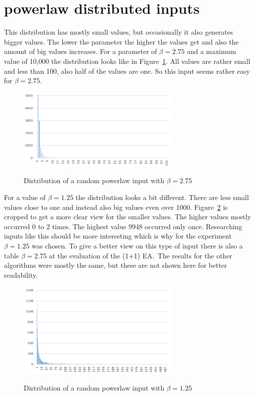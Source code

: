 \section{powerlaw distributed inputs}
This distribution has mostly small values, but occasionally it also generates bigger values.
The lower the parameter the higher the values get and also the amount of big values increases.
For a parameter of $\beta=2.75$ and a maximum value of 10,000 the distribution looks like in Figure~\ref{fig:powerDistExample1}.
All values are rather small and less than 100, also half of the values are one.
So this input seems rather easy for $\beta=2.75$.

\begin{figure}[h]
      \caption{Distribution of a random powerlaw input with $\beta=2.75$}
      \centering
      \includegraphics[width=0.7\textwidth]{figures/images/numberGenerator/powerlaw_-2_75.png}\label{fig:powerDistExample1}
\end{figure}

For a value of $\beta=1.25$ the distribution looks a bit different.
There are less small values close to one and instead also big values even over 1000.
Figure~\ref{fig:powerDistExample2} is cropped to get a more clear view for the smaller values.
The higher values mostly occurred 0 to 2 times.
The highest value 9948 occurred only once.
Researching inputs like this should be more interesting which is why for the experiment $\beta=1.25$ was chosen.
To give a better view on this type of input there is also a table $\beta=2.75$ at the evaluation of the (1+1) EA.\
The results for the other algorithms were mostly the same, but these are not shown here for better readability.

\begin{figure}[h]
      \caption{Distribution of a random powerlaw input with $\beta=1.25$}
      \centering
      \includegraphics[width=0.7\textwidth]{figures/images/numberGenerator/powerlaw_-1_25.png}\label{fig:powerDistExample2}
\end{figure}
